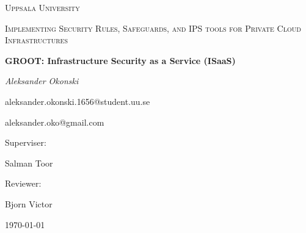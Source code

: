 \documentclass[12pt,a4paper]{report}
\begin{document}
\begin{titlepage}
    \centering
    {\scshape\Large Uppsala University \par}
    \vspace{1cm}
    {\scshape\Huge Implementing Security Rules, Safeguards, and IPS tools for Private Cloud Infrastructures\par}
    \vspace{1.5cm}
    {\Large\bfseries GROOT: Infrastructure Security as a Service (ISaaS)\par}
    \vspace{2cm}
    {\Large\itshape Aleksander Okonski\par}
    \vspace{1cm}
    aleksander.okonski.1656@student.uu.se\par
    aleksander.oko@gmail.com

    \vfill
    Superviser:\par
    Salman Toor\par
    \vspace{1cm}
    Reviewer:\par
    Bjorn Victor


    \vfill

    {\large \today\par}
\end{titlepage}
\end{document}
